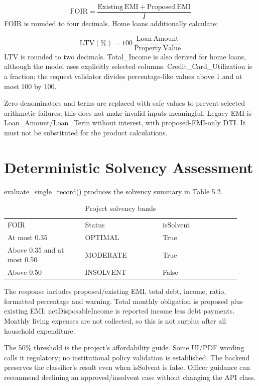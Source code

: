 \documentclass[12pt,a4paper]{report}
\begin{document}
\begin{equation}\mathrm{FOIR}=\frac{\mathrm{Existing\ EMI}+\mathrm{Proposed\ EMI}}{I}\end{equation}
FOIR is rounded to four decimals. Home loans additionally calculate:

\begin{equation}\mathrm{LTV}(\%)=100\,\frac{\mathrm{Loan\ Amount}}{\mathrm{Property\ Value}}\end{equation}
LTV is rounded to two decimals. Total\_Income is also derived for home loans, although the model uses explicitly selected columns. Credit\_Card\_Utilization is a fraction; the request validator divides percentage-like values above 1 and at most 100 by 100.

Zero denominators and terms are replaced with safe values to prevent selected arithmetic failures; this does not make invalid inputs meaningful. Legacy EMI is Loan\_Amount/Loan\_Term without interest, with proposed-EMI-only DTI. It must not be substituted for the product calculations.

\section{Deterministic Solvency Assessment}
evaluate\_single\_record() produces the solvency summary in Table 5.2.

\begin{longtable}{p{0.307\linewidth}p{0.307\linewidth}p{0.307\linewidth}}
\caption{Project solvency bands}\\

FOIR & Status & isSolvent\\
At most 0.35 & OPTIMAL & True\\
Above 0.35 and at most 0.50 & MODERATE & True\\
Above 0.50 & INSOLVENT & False\\
\end{longtable}
The response includes proposed/existing EMI, total debt, income, ratio, formatted percentage and warning. Total monthly obligation is proposed plus existing EMI; netDisposableIncome is reported income less debt payments. Monthly living expenses are not collected, so this is not surplus after all household expenditure.

The 50\% threshold is the project's affordability guide. Some UI/PDF wording calls it regulatory; no institutional policy validation is established. The backend preserves the classifier's result even when isSolvent is false. Officer guidance can recommend declining an approved/insolvent case without changing the API class.
\end{document}
